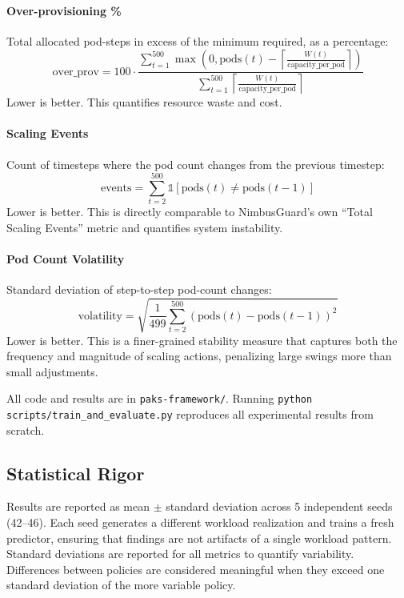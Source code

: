 \paragraph{Over-provisioning \%} Total allocated pod-steps in excess of the minimum required, as a percentage:
\[
\text{over\_prov} = 100 \cdot \frac{\sum_{t=1}^{500} \max\left(0, \text{pods}(t) - \left\lceil \frac{W(t)}{\text{capacity\_per\_pod}} \right\rceil\right)}{\sum_{t=1}^{500} \left\lceil \frac{W(t)}{\text{capacity\_per\_pod}} \right\rceil}
\]
Lower is better. This quantifies resource waste and cost.

\paragraph{Scaling Events} Count of timesteps where the pod count changes from the previous timestep:
\[
\text{events} = \sum_{t=2}^{500} \mathbb{1}[\text{pods}(t) \neq \text{pods}(t-1)]
\]
Lower is better. This is directly comparable to NimbusGuard's own ``Total Scaling Events'' metric and quantifies system instability.

\paragraph{Pod Count Volatility} Standard deviation of step-to-step pod-count changes:
\[
\text{volatility} = \sqrt{\frac{1}{499} \sum_{t=2}^{500} \left(\text{pods}(t) - \text{pods}(t-1)\right)^2}
\]
Lower is better. This is a finer-grained stability measure that captures both the frequency and magnitude of scaling actions, penalizing large swings more than small adjustments.

All code and results are in \texttt{paks-framework/}. Running \texttt{python scripts/train\_and\_evaluate.py} reproduces all experimental results from scratch.

\subsection{Statistical Rigor}

Results are reported as mean $\pm$ standard deviation across 5 independent seeds (42--46). Each seed generates a different workload realization and trains a fresh predictor, ensuring that findings are not artifacts of a single workload pattern. Standard deviations are reported for all metrics to quantify variability. Differences between policies are considered meaningful when they exceed one standard deviation of the more variable policy.
